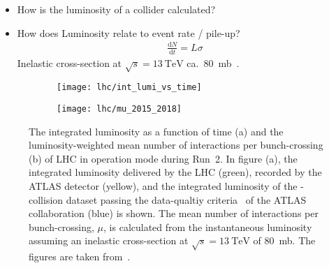 \begin{itemize}
\item How is the luminosity of a collider calculated?

\item How does Luminosity relate to event rate / pile-up?
  \begin{align*}
    \frac{\mathrm{d}N}{\mathrm{d}t} = L \sigma
  \end{align*}
  Inelastic \pp cross-section at $\sqrt{s} = \SI{13}{\TeV}$ ca.\
  \SI{80}{\milli\barn}~\cite{STDM-2015-05}.

\end{itemize}


\begin{figure}[htbp]
  \centering

  \begin{subfigure}{0.47\textwidth}
    \texttt{[image: lhc/int\_lumi\_vs\_time]}
    \subcaption{}
  \end{subfigure}\hspace*{0.02\textwidth}%
  \begin{subfigure}{0.47\textwidth}
    \texttt{[image: lhc/mu\_2015\_2018]}
    \subcaption{}
  \end{subfigure}

  \caption{The integrated luminosity as a function of time (a) and the
    luminosity-weighted mean number of interactions per bunch-crossing (b) of
    LHC in \pp operation mode during Run~2. In figure (a), the integrated
    luminosity delivered by the LHC (green), recorded by the ATLAS detector
    (yellow), and the integrated luminosity of the \pp-collision dataset passing
    the data-qualtiy criteria~\cite{DAPR-2018-01} of the ATLAS collaboration
    (blue) is shown. The mean number of interactions per bunch-crossing, $\mu$,
    is calculated from the instantaneous luminosity assuming an inelastic \pp
    cross-section at $\sqrt{s} = \SI{13}{\TeV}$ of \SI{80}{\milli\barn}. The
    figures are taken from~\cite{atlas_luminosity_summary_plots}.}%
  \label{fig:lumi_and_pu}
\end{figure}

